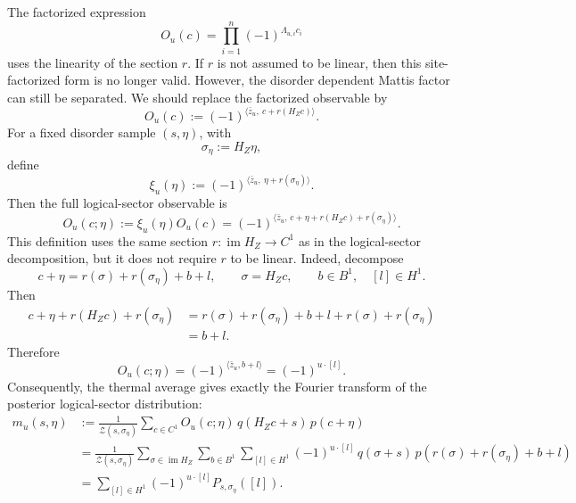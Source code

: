 \documentclass[twoside,english,aps,showpacs,pra,superscriptaddress]{revtex4-2}
\DeclareMathOperator{\im}{im}
\begin{document}
The factorized expression
\[
    O_u(c)=\prod_{i=1}^n(-1)^{\Lambda_{u,i}c_i}
\]
uses the linearity of the section \(r\). If \(r\) is not assumed to be linear,
then this site-factorized form is no longer valid. However, the disorder
dependent Mattis factor can still be separated. We should replace the
factorized observable by
\begin{equation}\label{eq:correct-Ou-nonlinear}
    O_u(c):=
    (-1)^{\langle \bar z_u,\ c+r(H_Zc)\rangle}.
\end{equation}
For a fixed disorder sample \((s,\eta)\), with
\[
    \sigma_\eta:=H_Z\eta,
\]
define
\begin{equation}\label{eq:xi-nonlinear}
    \xi_u(\eta):=
    (-1)^{\langle \bar z_u,\ \eta+r(\sigma_\eta)\rangle}.
\end{equation}
Then the full logical-sector observable is
\begin{equation}\label{eq:Ou-full-nonlinear}
    O_u(c;\eta)
    :=
    \xi_u(\eta) O_u(c)
    =
    (-1)^{
    \langle
    \bar z_u,\,
    c+\eta+r(H_Zc)+r(\sigma_\eta)
    \rangle
    }.
\end{equation}
This definition uses the same section \(r:\im H_Z\to C^1\) as in the
logical-sector decomposition, but it does not require \(r\) to be linear.
Indeed, decompose
\begin{equation}\label{eq:sector-decomp-r}
    c+\eta=r(\sigma)+r(\sigma_\eta)+b+l,
    \qquad
    \sigma=H_Zc,
    \qquad
    b\in B^1,\quad [l]\in H^1 .
\end{equation}
Then
\[
\begin{aligned}
    c+\eta+r(H_Zc)+r(\sigma_\eta)
    &=
    r(\sigma)+r(\sigma_\eta)+b+l+r(\sigma)+r(\sigma_\eta)\\
    &=
    b+l .
\end{aligned}
\]
Therefore
\begin{equation}\label{eq:Ou-reads-logical-sector}
    O_u(c;\eta)
    =
    (-1)^{\langle \bar z_u,b+l\rangle}
    =
    (-1)^{u\cdot[l]}.
\end{equation}
Consequently, the thermal average gives exactly the Fourier transform of the
posterior logical-sector distribution:
\begin{equation}\label{eq:m-u-fourier-corrected}
\begin{aligned}
    m_u(s,\eta)
    &:=
    \frac{1}{\mathcal Z(s,\sigma_\eta)}
    \sum_{c\in C^1}
    O_u(c;\eta)\,
    q(H_Zc+s)\,
    p(c+\eta)
    \\
    &=
    \frac{1}{\mathcal Z(s,\sigma_\eta)}
    \sum_{\sigma\in\im H_Z}
    \sum_{b\in B^1}
    \sum_{[l]\in H^1}
    (-1)^{u\cdot[l]}\,
    q(\sigma+s)\,
    p\!\left(r(\sigma)+r(\sigma_\eta)+b+l\right)
    \\
    &=
    \sum_{[l]\in H^1}
    (-1)^{u\cdot[l]}
    P_{s,\sigma_\eta}([l]).
\end{aligned}
\end{equation}
\end{document}
